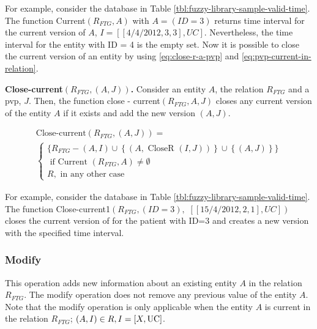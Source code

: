 For example, consider the database in Table \ref{tbl:fuzzy-library-sample-valid-time}. The function Current$\left(R_{FTG}, A \right)$ with $A =\left(ID=3\right)$ returns time interval for the current version of $A$, $I = \left[ \left[4/4/2012, 3, 3 \right], UC \right]$. Nevertheless, the time interval for the entity with ID = 4 is the empty set.
Now it is possible to close the current version of an entity by using \eqref{eq:close-r-a-pvp} and \eqref{eq:pvp-current-in-relation}.

\begin{definition}
\label{def:pvp-close-current-version}
\textbf{Close-current$\left(R_{FTG}, \left(A, J \right) \right)$.}
Consider an entity $A$, the relation $R_{FTG}$ and a pvp, $J$. Then, the function close - current$\left(R_{FTG}, A, J \right)$ closes any current version of the entity $A$ if it exists and add the new version $\left(A, J \right)$.

\begin{eqnarray}
\label{eq:pvp-close-current}
\text{Close-current} \left(R_{FTG}, \left(A, J \right) \right) =\\
\begin{cases}
\nonumber
\big \lbrace R_{FTG} - \left(A, I \right) \cup \left \lbrace \left(A, \mbox{ CloseR } \left(I, J\right) \right) \right \rbrace \cup \left \lbrace \left(A, J\right)\right \rbrace  \big \rbrace \\
\nonumber
\mbox{ if Current } \left(R_{FTG}, A \right) \neq \emptyset \\ %
\nonumber R , \text{ in any other case}
\end{cases}
\end{eqnarray}
\end{definition}

For example, consider the database in Table  \ref{tbl:fuzzy-library-sample-valid-time}. The function Close-current1$\left(R_{FTG}, \left(ID=3\right) \right.,$ $\left. \left[ \left[15/4/2012,2,1\right], UC\right]\right)$ closes the current version of for the patient with ID=3 and creates a new version with the specified time interval.

\subsubsection{\label{subsubsec:modify-fuzzy-temporal}Modify}
This operation adds new information about an existing entity $A$ in the relation $R_{FTG}$. The modify operation does not remove any previous value of the entity $A$.
Note that the modify operation is only applicable when the entity $A$ is current in the relation $R_{FTG}$; $ \left(A, I \right) \in R, I = \left[X, \operatorname{UC} \right]$.

